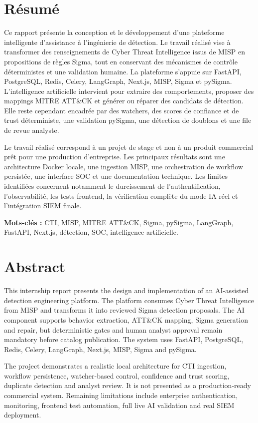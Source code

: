 \chapter*{Résumé}

Ce rapport présente la conception et le développement d'une plateforme intelligente d'assistance à l'ingénierie de détection. Le travail réalisé vise à transformer des renseignements de Cyber Threat Intelligence issus de MISP en propositions de règles Sigma, tout en conservant des mécanismes de contrôle déterministes et une validation humaine. La plateforme s'appuie sur FastAPI, PostgreSQL, Redis, Celery, LangGraph, Next.js, MISP, Sigma et pySigma. L'intelligence artificielle intervient pour extraire des comportements, proposer des mappings MITRE ATT\&CK et générer ou réparer des candidats de détection. Elle reste cependant encadrée par des watchers, des scores de confiance et de trust déterministe, une validation pySigma, une détection de doublons et une file de revue analyste.

Le travail réalisé correspond à un projet de stage et non à un produit commercial prêt pour une production d'entreprise. Les principaux résultats sont une architecture Docker locale, une ingestion MISP, une orchestration de workflow persistée, une interface SOC et une documentation technique. Les limites identifiées concernent notamment le durcissement de l'authentification, l'observabilité, les tests frontend, la vérification complète du mode IA réel et l'intégration SIEM finale.

\textbf{Mots-clés :} CTI, MISP, MITRE ATT\&CK, Sigma, pySigma, LangGraph, FastAPI, Next.js, détection, SOC, intelligence artificielle.

\chapter*{Abstract}

This internship report presents the design and implementation of an AI-assisted detection engineering platform. The platform consumes Cyber Threat Intelligence from MISP and transforms it into reviewed Sigma detection proposals. The AI component supports behavior extraction, ATT\&CK mapping, Sigma generation and repair, but deterministic gates and human analyst approval remain mandatory before catalog publication. The system uses FastAPI, PostgreSQL, Redis, Celery, LangGraph, Next.js, MISP, Sigma and pySigma.

The project demonstrates a realistic local architecture for CTI ingestion, workflow persistence, watcher-based control, confidence and trust scoring, duplicate detection and analyst review. It is not presented as a production-ready commercial system. Remaining limitations include enterprise authentication, monitoring, frontend test automation, full live AI validation and real SIEM deployment.
